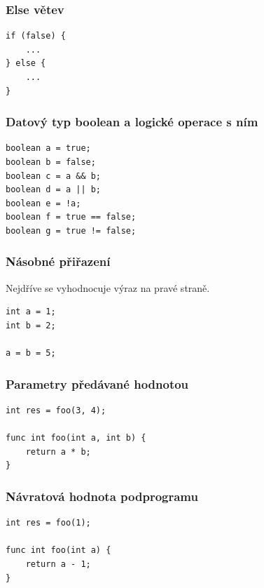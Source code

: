 \documentclass[czech, oth, kiv, he, iso690numb, viewonly]{fasthesis}
\begin{document}
    \subsubsection*{Else větev}
    \begin{verbatim}
if (false) {
    ...
} else {
    ...
}
    \end{verbatim}

    \subsubsection*{Datový typ boolean a logické operace s ním}
    \begin{verbatim}
boolean a = true;
boolean b = false;
boolean c = a && b;
boolean d = a || b;
boolean e = !a;
boolean f = true == false;
boolean g = true != false;
    \end{verbatim}

    \subsubsection*{Násobné přiřazení}
    Nejdříve se vyhodnocuje výraz na pravé straně.
    \begin{verbatim}
int a = 1;
int b = 2;

a = b = 5;
    \end{verbatim}

    \subsubsection*{Parametry předávané hodnotou}
    \begin{verbatim}
int res = foo(3, 4);
    
func int foo(int a, int b) {
    return a * b;
}
    \end{verbatim}

    \subsubsection*{Návratová hodnota podprogramu}
    \begin{verbatim} 
int res = foo(1);

func int foo(int a) {
    return a - 1;
}
    \end{verbatim}
\end{document}
